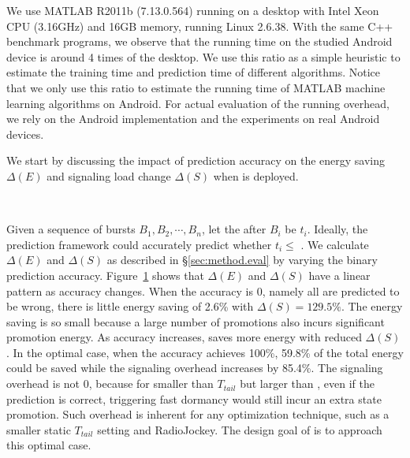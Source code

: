 We use MATLAB R2011b (7.13.0.564) running on a desktop with Intel Xeon CPU (3.16GHz) and 16GB memory, running Linux 2.6.38. With the same C++ benchmark programs, we observe that the running time on the studied Android device is around 4 times of the desktop. We use this ratio as a simple heuristic to estimate the training time and prediction time of different algorithms. Notice that we only use this ratio to estimate the running time of MATLAB machine learning algorithms on Android. For actual evaluation of the running overhead, we rely on the Android implementation and the experiments on real Android devices.


We start by discussing the impact of \IBT prediction accuracy on the energy saving $\Delta(E)$ and signaling load change $\Delta(S)$ when \NAME is deployed.


\begin{figure}[h]
\centering
{} \\
\label{fig:accuracy}
\end{figure}


Given a sequence of bursts $B_{1}, B_{2}, \cdots, B_{n}$, let the \IBT after $B_{i}$ be $t_{i}$. Ideally, the prediction framework could accurately predict whether $t_{i} \leq $ \SBT. We calculate $\Delta(E)$ and $\Delta(S)$ as described in \S\ref{sec:method.eval} by varying the binary prediction accuracy. Figure~\ref{fig:accuracy} shows that $\Delta(E)$ and $\Delta(S)$ have a linear pattern as accuracy changes. When the accuracy is 0, namely all \IBTS are predicted to be wrong, there is little energy saving of 2.6\% with $\Delta(S) = 129.5\%$. The energy saving is so small because a large number of promotions also incurs significant promotion energy.
As accuracy increases, \NAME saves more energy with reduced $\Delta(S)$. In the optimal case, when the accuracy achieves 100\%, 59.8\% of the total energy could be saved while the signaling overhead increases by 85.4\%. The signaling overhead is not 0, because for \IBTS smaller than $T_{tail}$ but larger than \SBT, even if the prediction is correct, triggering fast dormancy would still incur an extra state promotion. Such overhead is inherent for any optimization technique, such as a smaller static $T_{tail}$ setting and RadioJockey. The design goal of \NAME is to approach this optimal case.

